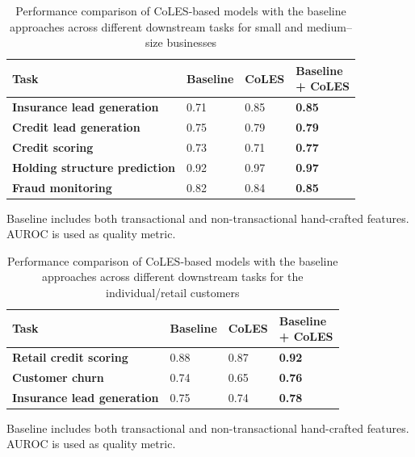 \documentclass[sigconf]{acmart}
\begin{document}
\begin{table}
\centering
\caption{Performance comparison of CoLES-based models with the baseline approaches across different downstream tasks for small and medium--size businesses}
\begin{tabularx}{\linewidth}{Xlll}
\toprule
\textbf{Task} & \textbf{Baseline } & \textbf{CoLES} & \makecell{\textbf{Baseline} \\ \textbf{+ CoLES}} \\ 
\midrule
\textbf{Insurance lead generation} & 0.71 & 0.85 & \textbf{0.85} \\
\textbf{Credit lead generation} & 0.75 & 0.79 & \textbf{0.79} \\
\textbf{Credit scoring} & 0.73 & 0.71 & \textbf{0.77} \\
\textbf{Holding structure prediction} & 0.92 & 0.97 & \textbf{0.97} \\
\textbf{Fraud monitoring} & 0.82 & 0.84 & \textbf{0.85} \\
\bottomrule
\end{tabularx}
\small{Baseline includes both transactional and non-transactional hand-crafted features. AUROC is used as quality metric.}
\label{tab-internal-company}
\end{table}



\begin{table}
\centering
\caption{Performance comparison of CoLES-based models with the baseline approaches across different downstream tasks for the individual/retail customers}
\begin{tabular}{llll} 
\toprule
\textbf{Task } & \textbf{Baseline} & \textbf{CoLES} & \makecell{\textbf{Baseline}\\\textbf{+ CoLES}} \\
\midrule
\textbf{Retail credit scoring} & 0.88 & 0.87 & \textbf{0.92} \\
\textbf{Customer churn} & 0.74 & 0.65 & \textbf{0.76} \\
\textbf{Insurance lead generation} & 0.75 & 0.74 & \textbf{0.78} \\ %
\bottomrule
\end{tabular}

\small{Baseline includes both transactional and non-transactional hand-crafted features. AUROC is used as quality metric.}
\label{tab-internal-person}
\end{table}
\end{document}
